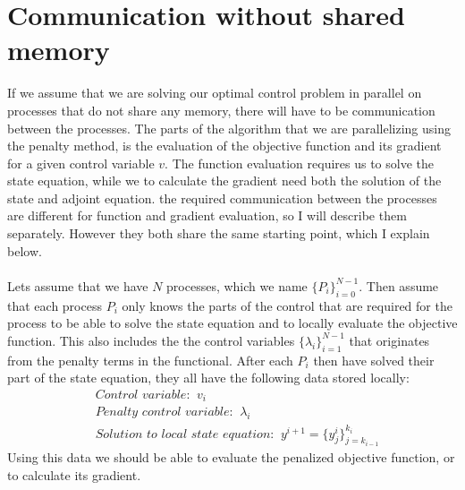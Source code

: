 \section{Communication without shared memory}
If we assume that we are solving our optimal control problem in parallel on processes that do not share any memory, there will have to be communication between the processes. The parts of the algorithm that we are parallelizing using the penalty method, is the evaluation of the objective function and its gradient for a given control variable $v$. The function evaluation requires us to solve the state equation, while we to calculate the gradient need both the solution of the state and adjoint equation. the required communication between the processes are different for function and gradient evaluation, so I will describe them separately. However they both share the same starting point, which I explain below.
\\
\\
Lets assume that we have $N$ processes, which we name $\{P_{i}\}_{i=0}^{N-1}$. Then assume that each process $P_i$ only knows the parts of the control that are required for the process to be able to solve the state equation and to locally evaluate the objective function. This also includes the the control variables $\{\lambda_i\}_{i=1}^{N-1}$ that originates from the penalty terms in the functional. After each $P_i$ then have solved their part of the state equation, they all have the following data stored locally:
\begin{align*}
&\textit{Control variable: } \ v_i \\
&\textit{Penalty control variable: } \ \lambda_i \\
&\textit{Solution to local state equation: } \ y^{i+1} =\{y_j^i\}_{j=k_{i-1}}^{ k_{i}}
\end{align*}
Using this data we should be able to evaluate the penalized objective function, or to calculate its gradient.
